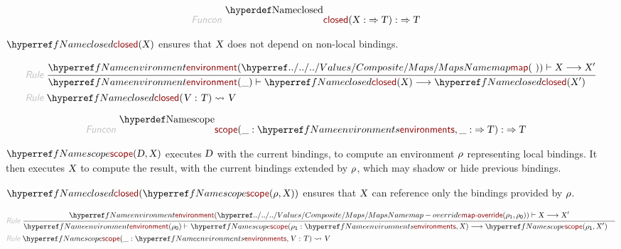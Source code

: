 \begin{displaymath}
\relax\begin{aligned}\relax
  \KEY{Funcon} ~ 
  & \NAMEDECL{closed}(\VAR{X} :  \TO \VAR{T}) :  \TO \VAR{T}
\end{aligned}
\end{displaymath}

$\SHADE{\NAMEREF{closed}
           ( \VAR{X} )}$ ensures that $\SHADE{\VAR{X}}$ does not depend on non-local bindings.

\begin{displaymath}
\relax\begin{aligned}\relax
  \KEY{Rule} ~ 
    & \RULE{
      \NAMEREF{environment} ( \NAMEHYPER{../../../Values/Composite}{Maps}{map}
                               (  ~  ) ) \vdash \VAR{X} \TRANS 
        \VAR{X}'
      }{
      & \NAMEREF{environment} ( \_ ) \vdash \NAMEREF{closed}
                      ( \VAR{X} ) \TRANS 
          \NAMEREF{closed}
            ( \VAR{X}' )
      }
\\
  \KEY{Rule} ~ 
    & \NAMEREF{closed}
        ( \VAR{V} : \VAR{T} ) \leadsto
        \VAR{V}
\end{aligned}
\end{displaymath}

\begin{displaymath}
\relax\begin{aligned}\relax
  \KEY{Funcon} ~ 
  & \NAMEDECL{scope}(\_ : \NAMEREF{environments}, \_ :  \TO \VAR{T}) :  \TO \VAR{T}
\end{aligned}
\end{displaymath}

$\SHADE{\NAMEREF{scope}
           ( \VAR{D},   
             \VAR{X} )}$ executes $\SHADE{\VAR{D}}$ with the current bindings, to compute an environment
  $\SHADE{\VAR{$\rho$}}$ representing local bindings. It then executes $\SHADE{\VAR{X}}$ to compute the result,
  with the current bindings extended by $\SHADE{\VAR{$\rho$}}$, which may shadow or hide previous
  bindings.

$\SHADE{\NAMEREF{closed}
           ( \NAMEREF{scope}
               ( \VAR{$\rho$},    
                 \VAR{X} ) )}$ ensures that $\SHADE{\VAR{X}}$ can reference only the bindings
  provided by $\SHADE{\VAR{$\rho$}}$.

\begin{displaymath}
\relax\begin{aligned}\relax
  \KEY{Rule} ~ 
    & \RULE{
      \NAMEREF{environment} ( \NAMEHYPER{../../../Values/Composite}{Maps}{map-override}
                               ( \VAR{$\rho$}\SUB{1},   
                                 \VAR{$\rho$}\SUB{0} ) ) \vdash \VAR{X} \TRANS 
        \VAR{X}'
      }{
      & \NAMEREF{environment} ( \VAR{$\rho$}\SUB{0} ) \vdash \NAMEREF{scope}
                      ( \VAR{$\rho$}\SUB{1} : \NAMEREF{environments},   
                        \VAR{X} ) \TRANS 
          \NAMEREF{scope}
            ( \VAR{$\rho$}\SUB{1},   
              \VAR{X}' )
      }
\\
  \KEY{Rule} ~ 
    & \NAMEREF{scope}
        ( \_ : \NAMEREF{environments},   
          \VAR{V} : \VAR{T} ) \leadsto
        \VAR{V}
\end{aligned}
\end{displaymath}

